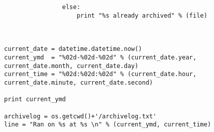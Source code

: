 \documentclass[11pt]{article}
\begin{document}
\begin{lstlisting}
                else:
                    print "%s already archived" % (file)



current_date = datetime.datetime.now()
current_ymd  = "%02d-%02d-%02d" % (current_date.year, current_date.month, current_date.day)
current_time = "%02d:%02d:%02d" % (current_date.hour, current_date.minute, current_date.second)

print current_ymd

archivelog = os.getcwd()+'/archivelog.txt'
line = "Ran on %s at %s \n" % (current_ymd, current_time)

\end{lstlisting}
\end{document}

